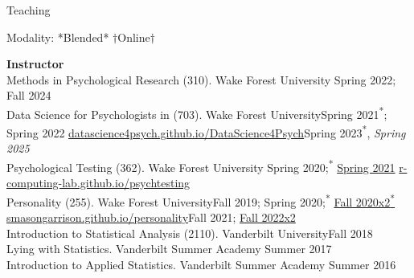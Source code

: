 \begin{rSection}{\textrm{Teaching}}
\vspace*{2pt}
\vspace{-1mm}\begin{center}\footnotesize{Modality: *Blended* $\dagger$Online$\dagger$}\end{center}\vspace{-4mm}
{\large  \bf Instructor}\\
Methods in Psychological Research (310). Wake Forest University \hfill{Spring 2022; Fall 2024}\\
Data Science for Psychologists in \R (703). Wake Forest University\hfill{Spring 2021\textsuperscript{*}; Spring 2022}
\hspace*{6 mm} \href{https://datascience4psych.github.io/DataScience4Psych/}{\color{blue} datascience4psych.github.io/DataScience4Psych}\hfill{Spring 2023\textsuperscript{*}, \textit{Spring 2025}}\smallskip\\
Psychological Testing  (362). Wake Forest University \hfill{Spring 2020;\textsuperscript{*} \href{https://www.youtube.com/playlist?list=PLKrrdtYgOUYYgag4erySD7L0jDcZGMlS_}{\color{blue}Spring 2021\noteBns}}
\hspace* {6 mm} \href{https://r-computing-lab.github.io/psychtesting/}{\color{blue} r-computing-lab.github.io/psychtesting}\smallskip\\
Personality (255). Wake Forest University\hfill{Fall 2019; Spring 2020;\textsuperscript{*} \href{https://www.youtube.com/playlist?list=PLKrrdtYgOUYZpENpYddjG8n_q3bfbx8Kr}{\color{blue}Fall 2020x2\textsuperscript{*}\noteBns}}\\
\hspace* {6 mm} \href{https://smasongarrison.github.io/personality/}{\color{blue} smasongarrison.github.io/personality}\hfill{Fall 2021; \href{https://www.youtube.com/playlist?list=PLKrrdtYgOUYZpENpYddjG8n_q3bfbx8Kr}{Fall 2022x2\noteBns}}\smallskip\\
Introduction to Statistical Analysis (2110). Vanderbilt University\hfill {Fall 2018}\\
Lying with Statistics. Vanderbilt Summer Academy \hfill{Summer 2017}\\
Introduction to Applied Statistics. Vanderbilt Summer Academy \hfill{Summer 2016}\smallskip\\

\end{rSection}
